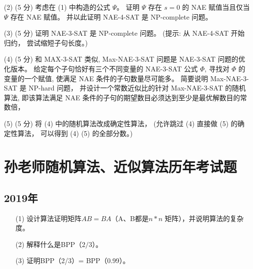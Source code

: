 \documentclass{article}
\begin{document}
    (2) (5 分) 考虑在 (1) 中构造的公式 $\Psi$。 证明 $\Psi$ 存在 $s=0$ 的 NAE 赋值当且仅当 $\Psi$ 存在 NAE 赋值。 并以此证明 NAE-4-SAT 是 NP-complete 问题。

    (3) (5 分) 证明 NAE-3-SAT 是 NP-complete 问题。 (提示: 从 NAE-4-SAT 开始归约， 尝试缩短子句长度。)

    (4) (5 分) 和 MAX-3-SAT 类似, Max-NAE-3-SAT 问题是 NAE-3-SAT 问题的优化版本。 给定每个子句恰好有三个不同变量的 NAE-3-SAT 公式 $\Phi$, 寻找对 $\Phi$ 的变量的一个赋值, 使满足 NAE 条件的子句数量尽可能多。 简要说明 Max-NAE-3-SAT 是 NP-hard 问题， 并设计一个常数近似比的针对 Max-NAE-3-SAT 的随机算法, 即该算法满足 NAE 条件的子句的期望数目必须达到至少是最优解数目的常数倍，

    (5) (5 分) 将 (4) 中的随机算法改成确定性算法， (允许跳过 (4) 直接做 (5) 的确定性算法， 可以得到 (4) (5) 的全部分数。)

\newpage
\section*{孙老师随机算法、近似算法历年考试题}
\subsection*{2019年}
\begin{itemize}
    \item[(1)] 设计算法证明矩阵$AB=BA$（A、B都是$n * n$ 矩阵），并说明算法的复杂度。
    \vspace{12em}
    \item[(2)] 解释什么是BPP（$2/3$）。
    \vspace{12em}
    \item[(3)] 证明BPP（2/3）= BPP（0.99）。
    \vspace{12em}
\end{itemize}

\newpage
\end{document}
